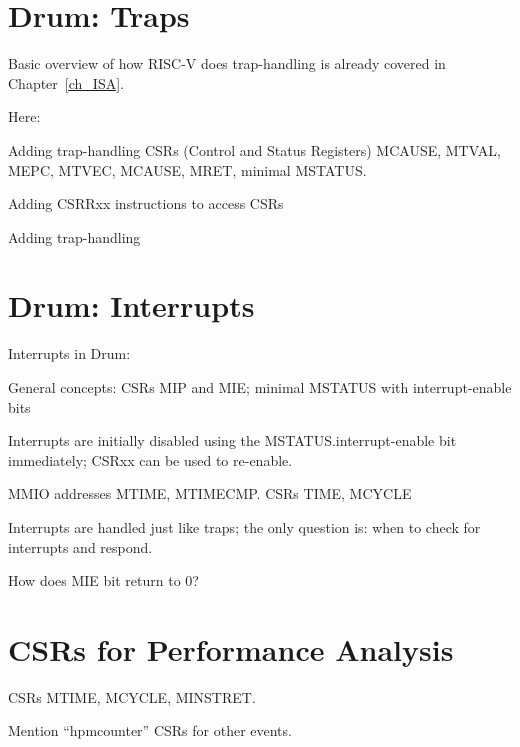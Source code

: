 \hdivider


\section{Drum: Traps}

Basic overview of how RISC-V does trap-handling is already covered in Chapter~\ref{ch_ISA}.

Here:

\begin{tightlist}

 \item Adding trap-handling CSRs (Control and Status Registers)
     MCAUSE, MTVAL, MEPC, MTVEC, MCAUSE, MRET, minimal MSTATUS.

 \item Adding CSRRxx instructions to access CSRs

 \item Adding trap-handling

\end{tightlist}


\section{Drum: Interrupts}

Interrupts in Drum:
\begin{tightlist}
  \item General concepts: CSRs MIP and MIE; minimal MSTATUS with interrupt-enable bits

  \item Interrupts are initially disabled using the
        MSTATUS.interrupt-enable bit immediately; CSRxx can be used to
        re-enable.

  \item MMIO addresses MTIME, MTIMECMP.  CSRs TIME, MCYCLE

  \item Interrupts are handled just like traps; the only question is:
        when to check for interrupts and respond.

  \item How does MIE bit return to 0?

\end{tightlist}


\section{CSRs for Performance Analysis}

CSRs MTIME, MCYCLE, MINSTRET.

Mention ``hpmcounter'' CSRs for other events.

